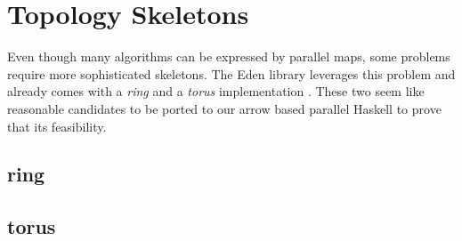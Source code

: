 \section{Topology Skeletons}
Even though many algorithms can be expressed by parallel maps, some problems require more sophisticated skeletons. The Eden library leverages this problem and already comes with a \textit{ring} and a \textit{torus} implementation \cite{eden_cefp, eden_skel_topology}. These two seem like reasonable candidates to be ported to our arrow based parallel Haskell to prove that its feasibility.

\subsection{ring}

\subsection{torus}